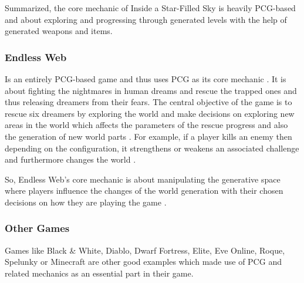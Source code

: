 \documentclass[MGS,Master,english]{twbook}%
\begin{document}
Summarized, the core mechanic of Inside a Star-Filled Sky is heavily PCG-based and about exploring and progressing through generated levels with the help of generated weapons and items.

\subsubsection{Endless Web}
Is an entirely PCG-based game and thus uses PCG as its core mechanic \cite{pcg::endlessWeb}. It is about fighting the nightmares in human dreams and rescue the trapped ones and thus releasing dreamers from their fears. The central objective of the game is to rescue six dreamers by exploring the world and make decisions on exploring new areas in the world which affects the parameters of the rescue progress and also the generation of new world parts \cite{pcg::endlessWeb}. For example, if a player kills an enemy then depending on the configuration, it strengthens or weakens an associated challenge and furthermore changes the world \cite{pcg::endlessWeb}.

So, Endless Web's core mechanic is about manipulating the generative space where players influence the changes of the world generation with their chosen decisions on how they are playing the game \cite{pcg::endlessWeb}.

\subsubsection{Other Games}
Games like Black \& White, Diablo, Dwarf Fortress, Elite, Eve Online, Roque, Spelunky or Minecraft are other good examples which made use of PCG and related mechanics as an essential part in their game.
\end{document}
